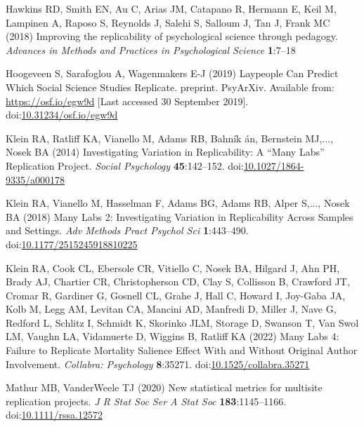 \documentclass[
  english,
  a4paper,
]{article}
\newlength{\cslhangindent}
\newlength{\cslentryspacingunit} %
\newenvironment{CSLReferences}[2] %
 {%
  \setlength{\parindent}{0pt}
  \ifodd #1
  \let\oldpar\par
  \def\par{\hangindent=\cslhangindent\oldpar}
  \fi
  \setlength{\parskip}{#2\cslentryspacingunit}
 }%
 {}
\begin{document}
\begin{CSLReferences}{1}{0}
\leavevmode{}%
Hawkins RD, Smith EN, Au C, Arias JM, Catapano R, Hermann E, Keil M, Lampinen A, Raposo S, Reynolds J, Salehi S, Salloum J, Tan J, Frank MC (2018) Improving the replicability of psychological science through pedagogy. \emph{Advances in Methods and Practices in Psychological Science} \textbf{1}:7--18

\leavevmode{}%
Hoogeveen S, Sarafoglou A, Wagenmakers E-J (2019) Laypeople {Can Predict Which Social Science Studies Replicate}. preprint. {PsyArXiv}. Available from: \url{https://osf.io/egw9d} {[}Last accessed 30 September 2019{]}. doi:\href{https://doi.org/10.31234/osf.io/egw9d}{10.31234/osf.io/egw9d}

\leavevmode{}%
Klein RA, Ratliff KA, Vianello M, Adams RB, Bahník án, Bernstein MJ,..., Nosek BA (2014) Investigating {Variation} in {Replicability}: {A} {``{Many Labs}''} {Replication Project}. \emph{Social Psychology} \textbf{45}:142--152. doi:\href{https://doi.org/10.1027/1864-9335/a000178}{10.1027/1864-9335/a000178}

\leavevmode{}%
Klein RA, Vianello M, Hasselman F, Adams BG, Adams RB, Alper S,..., Nosek BA (2018) Many {Labs} 2: {Investigating Variation} in {Replicability Across Samples} and {Settings}. \emph{Adv Methods Pract Psychol Sci} \textbf{1}:443--490. doi:\href{https://doi.org/10.1177/2515245918810225}{10.1177/2515245918810225}

\leavevmode{}%
Klein RA, Cook CL, Ebersole CR, Vitiello C, Nosek BA, Hilgard J, Ahn PH, Brady AJ, Chartier CR, Christopherson CD, Clay S, Collisson B, Crawford JT, Cromar R, Gardiner G, Gosnell CL, Grahe J, Hall C, Howard I, Joy-Gaba JA, Kolb M, Legg AM, Levitan CA, Mancini AD, Manfredi D, Miller J, Nave G, Redford L, Schlitz I, Schmidt K, Skorinko JLM, Storage D, Swanson T, Van Swol LM, Vaughn LA, Vidamuerte D, Wiggins B, Ratliff KA (2022) Many {Labs} 4: {Failure} to {Replicate Mortality Salience Effect With} and {Without Original Author Involvement}. \emph{Collabra: Psychology} \textbf{8}:35271. doi:\href{https://doi.org/10.1525/collabra.35271}{10.1525/collabra.35271}

\leavevmode{}%
Mathur MB, VanderWeele TJ (2020) New statistical metrics for multisite replication projects. \emph{J R Stat Soc Ser A Stat Soc} \textbf{183}:1145--1166. doi:\href{https://doi.org/10.1111/rssa.12572}{10.1111/rssa.12572}


\end{CSLReferences}
\end{document}
